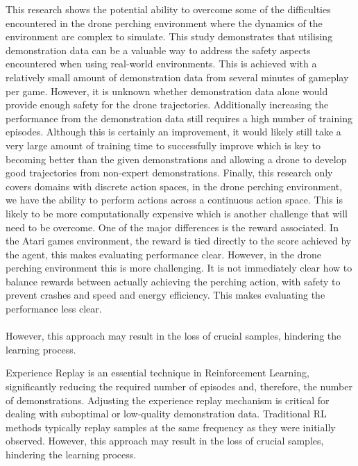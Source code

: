 This research shows the potential ability to overcome some of the difficulties encountered in the drone perching environment where the dynamics of the environment are complex to simulate.
This study demonstrates that utilising demonstration data can be a valuable way to address the safety aspects encountered when using real-world environments.
This is achieved with a relatively small amount of demonstration data from several minutes of gameplay per game.
However, it is unknown whether demonstration data alone would provide enough safety for the drone trajectories.
Additionally increasing the performance from the demonstration data still requires a high number of training episodes.
Although this is certainly an improvement, it would likely still take a very large amount of training time to successfully improve which is key to becoming better than the given demonstrations and allowing a drone to develop good trajectories from non-expert demonstrations.
Finally, this research only covers domains with discrete action spaces, in the drone perching environment, we have the ability to perform actions across a continuous action space.
This is likely to be more computationally expensive which is another challenge that will need to be overcome.
One of the major differences is the reward associated.
In the Atari games environment, the reward is tied directly to the score achieved by the agent, this makes evaluating performance clear.
However, in the drone perching environment this is more challenging.
It is not immediately clear how to balance rewards between actually achieving the perching action, with safety to prevent crashes and speed and energy efficiency.
This makes evaluating the performance less clear. \\\\



However, this approach may result in the loss of crucial samples, hindering the learning process.

Experience Replay is an essential technique in Reinforcement Learning, significantly reducing the required number of episodes and, therefore, the number of demonstrations.
Adjusting the experience replay mechanism is critical for dealing with suboptimal or low-quality demonstration data.
Traditional RL methods typically replay samples at the same frequency as they were initially observed.
However, this approach may result in the loss of crucial samples, hindering the learning process.


